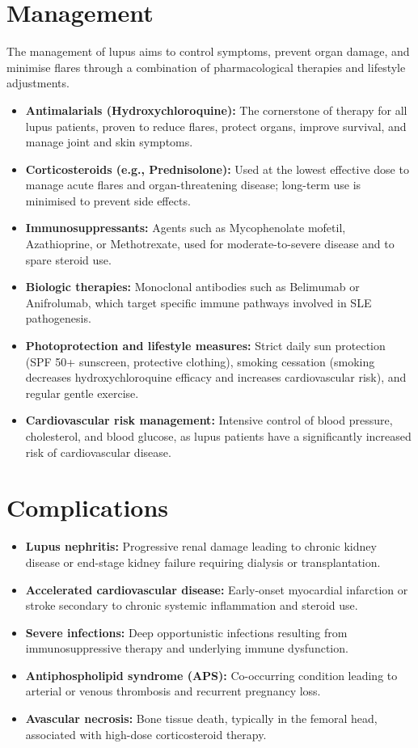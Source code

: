 \section*{Management}
The management of lupus aims to control symptoms, prevent organ damage, and minimise flares through a combination of pharmacological therapies and lifestyle adjustments.
\begin{itemize}
    \item \textbf{Antimalarials (Hydroxychloroquine):} The cornerstone of therapy for all lupus patients, proven to reduce flares, protect organs, improve survival, and manage joint and skin symptoms.
    \item \textbf{Corticosteroids (e.g., Prednisolone):} Used at the lowest effective dose to manage acute flares and organ-threatening disease; long-term use is minimised to prevent side effects.
    \item \textbf{Immunosuppressants:} Agents such as Mycophenolate mofetil, Azathioprine, or Methotrexate, used for moderate-to-severe disease and to spare steroid use.
    \item \textbf{Biologic therapies:} Monoclonal antibodies such as Belimumab or Anifrolumab, which target specific immune pathways involved in SLE pathogenesis.
    \item \textbf{Photoprotection and lifestyle measures:} Strict daily sun protection (SPF 50+ sunscreen, protective clothing), smoking cessation (smoking decreases hydroxychloroquine efficacy and increases cardiovascular risk), and regular gentle exercise.
    \item \textbf{Cardiovascular risk management:} Intensive control of blood pressure, cholesterol, and blood glucose, as lupus patients have a significantly increased risk of cardiovascular disease.
\end{itemize}

\section*{Complications}
\begin{itemize}
    \item \textbf{Lupus nephritis:} Progressive renal damage leading to chronic kidney disease or end-stage kidney failure requiring dialysis or transplantation.
    \item \textbf{Accelerated cardiovascular disease:} Early-onset myocardial infarction or stroke secondary to chronic systemic inflammation and steroid use.
    \item \textbf{Severe infections:} Deep opportunistic infections resulting from immunosuppressive therapy and underlying immune dysfunction.
    \item \textbf{Antiphospholipid syndrome (APS):} Co-occurring condition leading to arterial or venous thrombosis and recurrent pregnancy loss.
    \item \textbf{Avascular necrosis:} Bone tissue death, typically in the femoral head, associated with high-dose corticosteroid therapy.
\end{itemize}

